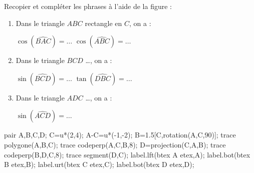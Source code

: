 \begin{exercice*}
    Recopier et compléter les phrases à l'aide de la figure :
    \begin{enumerate}
        \item Dans le triangle $ABC$ rectangle en $C$, on a :
        
        $\cos(\widehat{BAC})=\dots$ \hfill $\cos(\widehat{ABC})=\dots$
        \item Dans le triangle $BCD$ \dots{}, on a :
        
        $\sin(\widehat{BCD})=\dots$ \hfill $\tan(\widehat{DBC})=\dots$
        \item Dans le triangle $ADC$ \dots{}, on a :
        
        $\sin(\widehat{ACD})=\dots$
    \end{enumerate}

    \begin{Geometrie}[CoinHD={(7.5u,4.5u)}]        
        pair A,B,C,D;
        C=u*(2,4);
        A-C=u*(-1,-2);
        B=1.5[C,rotation(A,C,90)];
        trace polygone(A,B,C);            
        trace codeperp(A,C,B,8);
        D=projection(C,A,B);
        trace codeperp(B,D,C,8);
        trace segment(D,C);
        label.lft(btex A etex,A);
        label.bot(btex B etex,B);
        label.urt(btex C etex,C);
        label.bot(btex D etex,D);
    \end{Geometrie}
\end{exercice*}
